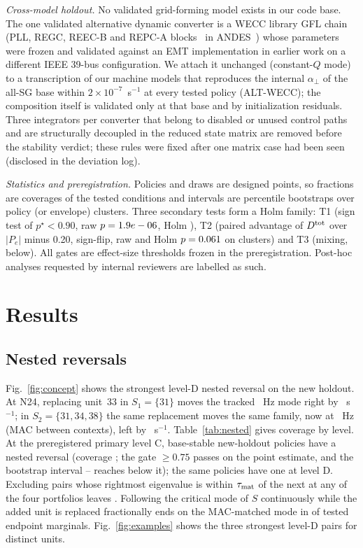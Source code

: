 \documentclass[journal]{IEEEtran}
\theoremstyle{remark}
\newcommand{\aperp}{\alpha_{\perp}}
\newcommand{\Dtot}{D^{\rm tot}}
\begin{document}
\emph{Cross-model holdout.} No validated grid-forming model exists in our code
base. The one validated alternative dynamic converter is a WECC library GFL chain
(PLL, REGC, REEC-B and REPC-A blocks~\cite{pourbeik2017generic} in
ANDES~\cite{cui2021andes}) whose parameters were frozen and validated against an
EMT implementation in earlier work on a different IEEE 39-bus configuration. We
attach it unchanged (constant-$Q$ mode) to a transcription of our machine models
that reproduces the internal $\aperp$ of the all-SG base within
$2\times10^{-7}$~s$^{-1}$ at every tested policy (ALT-WECC); the composition itself
is validated only at that base and by initialization residuals. Three integrators per
converter that belong to disabled or unused control paths and are structurally
decoupled in the reduced state matrix are removed before the stability verdict;
these rules were fixed after one matrix case had been seen (disclosed in the
deviation log).

\emph{Statistics and preregistration.} Policies and draws are designed points,
so fractions are coverages of the tested conditions and intervals are percentile
bootstraps over policy (or envelope) clusters. Three secondary tests form a Holm
family: T1 (sign test of $p^\star<0.90$, raw $p=1.9e-06$, Holm \tOnePholm), T2
(paired advantage of $\Dtot$ over $|P_e|$ minus 0.20, sign-flip, raw and Holm
$p=0.061$ on \nEligClusters{} clusters) and T3 (mixing, below). All gates are
effect-size thresholds frozen in the preregistration. Post-hoc analyses requested
by internal reviewers are labelled as such.

\section{Results}\label{sec:results}

\subsection{Nested reversals}

Fig.~\ref{fig:concept} shows the strongest level-D nested reversal on the new
holdout. At N24, replacing unit~33 in $S_1=\{31\}$ moves the tracked \exHzOne~Hz mode
right by \exDoneAbs~s$^{-1}$; in $S_2=\{31,34,38\}$ the same replacement moves the same
family, now at \exHzTwo~Hz (MAC \exMac{} between contexts), left by \exDtwo~s$^{-1}$.
Table~\ref{tab:nested} gives coverage by level. At the preregistered primary level
C, \cntCNew{} base-stable new-holdout policies have a nested reversal (coverage
\covCNew; the gate $\ge0.75$ passes on the point estimate, and the bootstrap
interval \covCNewLo--\covCNewHi{} reaches below it); the same policies have one at
level D. Excluding pairs whose rightmost eigenvalue is within $\tau_{\rm mat}$ of
the next at any of the four portfolios leaves \gapCov. Following the critical mode
of $S$ continuously while the added unit is replaced fractionally ends on the
MAC-matched mode in \contMatch{} of \contN{} tested endpoint marginals.
Fig.~\ref{fig:examples} shows the three strongest level-D pairs for distinct units.
\end{document}
